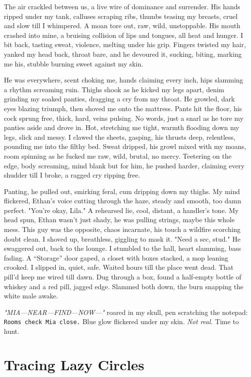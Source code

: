 \documentclass[12pt,oneside]{book} %
\newcommand{\note}[1]{\texttt{#1}}
\begin{document}
The air crackled between us, a live wire of dominance and surrender. His hands ripped under my tank, calluses scraping ribs, thumbs teasing my breasts, cruel and slow till I whimpered. A moan tore out, raw, wild, unstoppable. His mouth crashed into mine, a bruising collision of lips and tongues, all heat and hunger. I bit back, tasting sweat, violence, melting under his grip. Fingers twisted my hair, yanked my head back, throat bare, and he devoured it, sucking, biting, marking me his, stubble burning sweet against my skin.

He was everywhere, scent choking me, hands claiming every inch, hips slamming a rhythm screaming ruin. Thighs shook as he kicked my legs apart, denim grinding my soaked panties, dragging a cry from my throat. He growled, dark eyes blazing triumph, then shoved me onto the mattress. Pants hit the floor, his cock sprung free, thick, hard, veins pulsing. No words, just a snarl as he tore my panties aside and drove in. Hot, stretching me tight, warmth flooding down my legs, slick and messy. I clawed the sheets, gasping, his thrusts deep, relentless, pounding me into the filthy bed. Sweat dripped, his growl mixed with my moans, room spinning as he fucked me raw, wild, brutal, no mercy. Teetering on the edge, body screaming, mind blank but for him, he pushed harder, claiming every shudder till I broke, a ragged cry ripping free.

Panting, he pulled out, smirking feral, cum dripping down my thighs. My mind flickered, Ethan’s voice cutting through the haze, steady and smooth, too damn perfect. "You’re okay, Lila." A rehearsed lie, cool, distant, a handler’s tone. My head spun, Ethan wasn’t just shady, he was pulling strings, maybe this whole mess. This guy was the opposite, chaos incarnate, his touch a wildfire scorching doubt clean. I shoved up, breathless, giggling to mask it. "Need a sec, stud." He swaggered out, back to the lounge. I stumbled to the hall, heart slamming, bass fading. A “Storage” door gaped, a closet with boxes stacked, a mop leaning crooked. I slipped in, quiet, safe. Waited hours till the place went dead. That pill’d keep me wired till dawn. Dug through a box, found a half-empty bottle of whiskey and a red pill, jagged edge. Slammed both down, the burn snapping the white male awake.

\textit{"MIA—NEAR—FIND—NOW—"} roared in my skull, pen scratching the notepad: \note{Rooms check Mia close.} Blue glow flickered under my skin. \textit{Not real.} Time to hunt.

\chapter{Tracing Lazy Circles}
\end{document}
